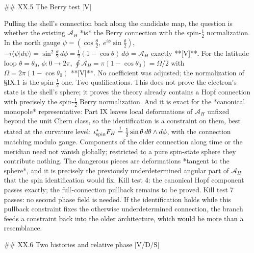 ## XX.5 The Berry test [V]

Pulling the shell's connection back along the candidate map, the question is whether the existing $\mathcal A_H$ *is* the Berry connection with the spin-$\tfrac12$ normalization. In the north gauge $\psi = (\cos\tfrac\theta2,\ e^{i\phi}\sin\tfrac\theta2)$, $-i\langle\psi|d\psi\rangle = \sin^2\tfrac\theta2\,d\phi = \tfrac12(1-\cos\theta)\,d\phi = \mathcal A_H$ exactly **[V]**. For the latitude loop $\theta = \theta_0$, $\phi:0\to2\pi$, $\oint\mathcal A_H = \pi(1-\cos\theta_0) = \Omega/2$ with $\Omega = 2\pi(1-\cos\theta_0)$ **[V]**. No coefficient was adjusted; the normalization of §IX.1 is the spin-$\tfrac12$ one. Two qualifications. This does not prove the electron's state is the shell's sphere; it proves the theory already contains a Hopf connection with precisely the spin-$\tfrac12$ Berry normalization. And it is exact for the *canonical monopole* representative: Part IX leaves local deformations of $\mathcal A_H$ unfixed beyond the unit Chern class, so the identification is a constraint on them, best stated at the curvature level: $\iota_{\rm spin}^*F_H\overset{!}{=}\tfrac12\sin\theta\,d\theta\wedge d\phi$, with the connection matching modulo gauge. Components of the older connection along time or the meridian need not vanish globally; restricted to a pure spin-state sphere they contribute nothing. The dangerous pieces are deformations *tangent to the sphere*, and it is precisely the previously underdetermined angular part of $\mathcal A_H$ that the spin identification would fix. Kill test 4: the canonical Hopf component passes exactly; the full-connection pullback remains to be proved. Kill test 7 passes: no second phase field is needed. If the identification holds while this pullback constraint fixes the otherwise underdetermined connection, the branch feeds a constraint back into the older architecture, which would be more than a resemblance.

## XX.6 Two histories and relative phase [V/D/S]

